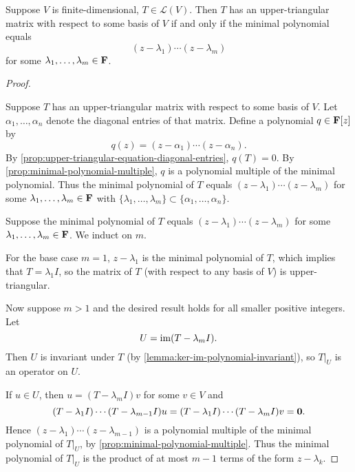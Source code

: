 \begin{proposition}\label{prop:upper-triangular-matrix-minimal-polynomial}
Suppose $V$ is finite-dimensional, $T\in\mathcal{L}(V)$. Then $T$ has an upper-triangular matrix with respect to some basis of $V$ if and only if the minimal polynomial equals
\[(z-\lambda_1)\cdots(z-\lambda_m)\]
for some $\lambda_1,\dots,\lambda_m\in\mathbf F$.
\end{proposition}

\begin{proof} \

\forward Suppose $T$ has an upper-triangular matrix with respect to some basis of $V$.
Let $\alpha_1,\dots,\alpha_n$ denote the diagonal entries of that matrix.
Define a polynomial $q\in\mathbf F[z]$ by
\[q(z)=(z-\alpha_1)\cdots(z-\alpha_n).\]
By \ref{prop:upper-triangular-equation-diagonal-entries}, $q(T)=0$. 
By \ref{prop:minimal-polynomial-multiple}, $q$ is a polynomial multiple of the minimal polynomial. 
Thus the minimal polynomial of $T$ equals $(z-\lambda_1)\cdots(z-\lambda_m)$ for some $\lambda_1,\dots,\lambda_m\in\mathbf F$ with $\{\lambda_1,\dots,\lambda_m\}\subset\{\alpha_1,\dots,\alpha_n\}$.

\backward Suppose the minimal polynomial of $T$ equals $(z-\lambda_1)\cdots(z-\lambda_m)$ for some $\lambda_1,\dots,\lambda_m\in\mathbf F$. We induct on $m$.

For the base case $m=1$, $z-\lambda_1$ is the minimal polynomial of $T$, which implies that $T=\lambda_1 I$, so the matrix of $T$ (with respect to any basis of $V$) is upper-triangular.

Now suppose $m>1$ and the desired result holds for all smaller positive integers. Let
\[U=\operatorname{im}(T-\lambda_m I).\]
Then $U$ is invariant under $T$ (by \ref{lemma:ker-im-polynomial-invariant}), so $T|_U$ is an operator on $U$.

If $u\in U$, then $u=(T-\lambda_m I)v$ for some $v\in V$ and
\[(T-\lambda_1 I)\cdots(T-\lambda_{m-1}I)u=(T-\lambda_1 I)\cdots(T-\lambda_m I)v=\vb{0}.\]
Hence $(z-\lambda_1)\cdots(z-\lambda_{m-1})$ is a polynomial multiple of the minimal polynomial of $T|_U$, by \ref{prop:minimal-polynomial-multiple}. Thus the minimal polynomial of $T|_U$ is the product of at most $m-1$ terms of the form $z-\lambda_k$.


\end{proof}
